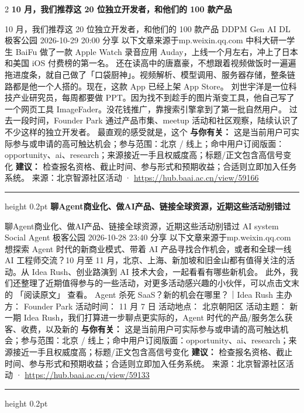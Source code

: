 \documentclass[10.5pt]{ctexart}
\begin{document}
\begin{multicols}{2}
{\large\bfseries 10 月，我们推荐这 20 位独立开发者，和他们的 100 款产品}\par
10 月，我们推荐这 20 位独立开发者，和他们的 100 款产品 DDPM Gen AI DL 极客公园 2026-10-29 20:00 分享 以下文章来源于mp.weixin.qq.com 中科大研一学生 BaiFu 做了一款 Apple Watch 录音应用 Auday，上线一个月左右，冲上了日本和美国 iOS 付费榜的第一名。 还在读高中的唐嘉豪，不想跟着视频做饭时一遍遍拖进度条，就自己做了「口袋厨神」。视频解析、模型调用、服务器存储，整条链路都是他一个人搭的。现在，这款 App 已经上架 App Store。 刘世宇洋是一位科技产业研究员，每周都要做 PPT。因为找不到趁手的图片渐变工具，他自己写了一个网页工具 ImageFader。没花钱推广，靠搜索引擎拿到了第一批自然用户。 过去一段时间，Founder Park 通过产品市集、meetup 活动和社区观察，陆续认识了不少这样的独立开发者。 最直观的感受就是，这个
\textbf{与你有关：} 这是当前用户可实际参与或申请的高可触达机会；参与范围：北京 / 线上；命中用户订阅版面：opportunity、ai、research；来源接近一手且权威度高；标题/正文包含高信号变化
\textbf{建议：} 检查报名资格、截止时间、参与形式和预期收益；合适则立即加入任务系统。
{\footnotesize\color{ormuted} 来源：北京智源社区活动 · \url{https://hub.baai.ac.cn/view/59166}}
\vspace{2mm}
\hrule height 0.2pt
\vspace{2mm}
{\large\bfseries 聊Agent商业化、做AI产品、链接全球资源，近期这些活动别错过}\par
聊Agent商业化、做AI产品、链接全球资源，近期这些活动别错过 AI system Social Agent 极客公园 2026-10-28 23:40 分享 以下文章来源于mp.weixin.qq.com 想探索 Agent 时代的新商业模式、带着 AI 产品寻找合作机会，或者和全球一线 AI 工程师交流？10 月至 11 月，北京、上海、新加坡和旧金山都有值得关注的活 动。从 Idea Rush、创业路演到 AI 技术大会，一起看看有哪些新机会。 此外，我们还整理了近期值得参与的一些活动，对更多活动感兴趣的小伙伴，可以点击文末的 「阅读原文」 查看。 Agent 杀死 SaaS？新的机会在哪里？｜Idea Rush 主办方： Founder Park 活动时间： 11 月 7 日 活动地点： 北京朝阳区 活动主题： 新一期 Idea Rush，我们打算进一步聊点更实际的，Agent 时代的产品/服务怎么获客、收费，以及新的
\textbf{与你有关：} 这是当前用户可实际参与或申请的高可触达机会；参与范围：北京 / 线上；命中用户订阅版面：opportunity、ai、research；来源接近一手且权威度高；标题/正文包含高信号变化
\textbf{建议：} 检查报名资格、截止时间、参与形式和预期收益；合适则立即加入任务系统。
{\footnotesize\color{ormuted} 来源：北京智源社区活动 · \url{https://hub.baai.ac.cn/view/59133}}
\vspace{2mm}
\hrule height 0.2pt
\vspace{2mm}

\end{multicols}
\end{document}
